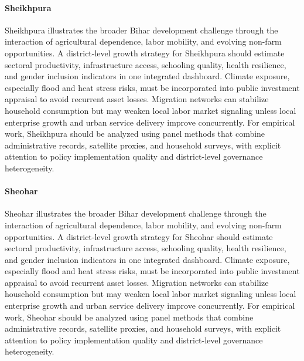 \documentclass[preprint,12pt]{elsarticle}
\begin{document}
\paragraph{Sheikhpura} Sheikhpura illustrates the broader Bihar development challenge through the interaction of agricultural dependence, labor mobility, and evolving non-farm opportunities. A district-level growth strategy for Sheikhpura should estimate sectoral productivity, infrastructure access, schooling quality, health resilience, and gender inclusion indicators in one integrated dashboard. Climate exposure, especially flood and heat stress risks, must be incorporated into public investment appraisal to avoid recurrent asset losses. Migration networks can stabilize household consumption but may weaken local labor market signaling unless local enterprise growth and urban service delivery improve concurrently. For empirical work, Sheikhpura should be analyzed using panel methods that combine administrative records, satellite proxies, and household surveys, with explicit attention to policy implementation quality and district-level governance heterogeneity.

\paragraph{Sheohar} Sheohar illustrates the broader Bihar development challenge through the interaction of agricultural dependence, labor mobility, and evolving non-farm opportunities. A district-level growth strategy for Sheohar should estimate sectoral productivity, infrastructure access, schooling quality, health resilience, and gender inclusion indicators in one integrated dashboard. Climate exposure, especially flood and heat stress risks, must be incorporated into public investment appraisal to avoid recurrent asset losses. Migration networks can stabilize household consumption but may weaken local labor market signaling unless local enterprise growth and urban service delivery improve concurrently. For empirical work, Sheohar should be analyzed using panel methods that combine administrative records, satellite proxies, and household surveys, with explicit attention to policy implementation quality and district-level governance heterogeneity.
\end{document}
